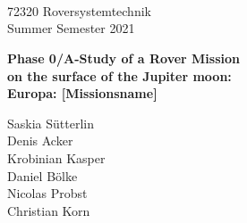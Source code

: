 %
%
\begin{titlepage}
\begin{center}



  \vspace{10mm} 
         {\large \hspace{13mm} \\
         \large \hspace{13mm} \\
         \large \hspace{13mm} \\
         \large \hspace{13mm} 72320 Roversystemtechnik\\
         \centering 
         \hspace{13mm} Summer Semester 2021\\   }
  \vspace{10mm}

         {\Large
          \bf
          \hspace{20mm} Phase 0/A-Study of a Rover Mission \\} 
         {\Large
          \bf
          \hspace{20mm} on the surface of the Jupiter moon:\\
          } 
         {\Large
          \bf
          \hspace{20mm} Europa: [Missionsname]\\
          }
 

  \vspace{30mm}
         {\large \hspace{20mm}Saskia Sütterlin}\\       
         {\large \hspace{20mm}Denis Acker}\\
         {\large \hspace{20mm}Krobinian Kasper}\\
         {\large \hspace{20mm}Daniel Bölke}\\
         {\large \hspace{20mm}Nicolas Probst}\\    
         {\large \hspace{20mm}Christian Korn}\\
  \vspace{20mm}
  \makebox[40mm]{}\\


\end{center}
\end{titlepage}
